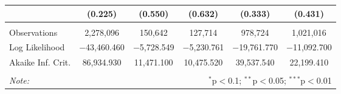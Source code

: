 \begin{table}[!htbp]
\begin{tabular}{@{\extracolsep{5pt}}lccccc}
  & (0.225) & (0.550) & (0.632) & (0.333) & (0.431) \\ 
 \hline \\[-1.8ex] 
Observations & 2,278,096 & 150,642 & 127,714 & 978,724 & 1,021,016 \\ 
Log Likelihood & $-$43,460.460 & $-$5,728.549 & $-$5,230.761 & $-$19,761.770 & $-$11,092.700 \\ 
Akaike Inf. Crit. & 86,934.930 & 11,471.100 & 10,475.520 & 39,537.540 & 22,199.410 \\ 
\hline 
\hline \\[-1.8ex] 
\textit{Note:}  & \multicolumn{5}{r}{$^{*}$p$<$0.1; $^{**}$p$<$0.05; $^{***}$p$<$0.01} \\ 
\end{tabular} 
\end{table} 
